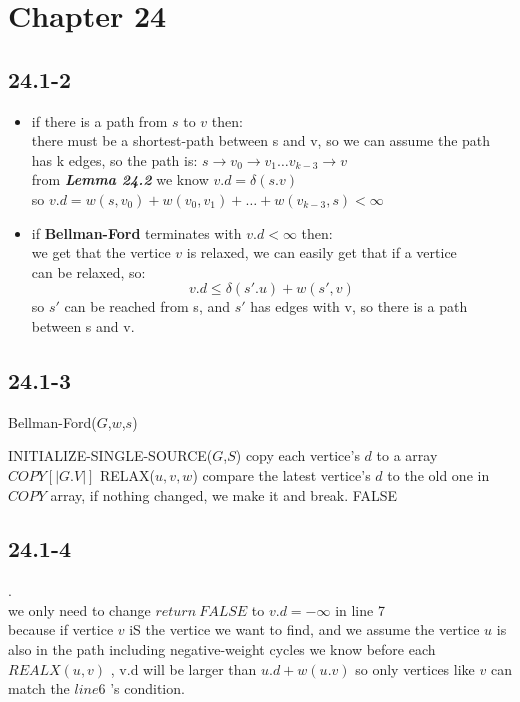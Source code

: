 \documentclass[a4paper,UTF8]{article}
\theoremstyle{definition}
\begin{document}
\section*{Chapter 24 }

\subsection*{24.1-2}
\begin{itemize}

  \item if there is a path from $s$ to $v$ then: \\
  there must be a shortest-path between s and v, so we can assume the path\\
  has k edges, so the path is: $s \to v_0 \to v_1 \ldots v_{k-3} \to v$ \\
  from \textbf{\textit{Lemma 24.2}}  we know $v.d= \delta (s.v)$\\
  so $v.d=w(s,v_0)+w(v_0,v_1)+\ldots+w(v_{k-3},s)<\infty$\\
  \item if \textbf{Bellman-Ford} terminates with $v.d<\infty$ then:\\
  we get that the vertice $v$ is relaxed, we can easily get that if a vertice\\
  can be relaxed, so:
  \[
   v.d\le \delta(s'.u)+w(s',v)
   \]
  so $s'$ can be reached from s, and $s'$ has edges with v, so there is a path between s and v.
\end{itemize}
\subsection*{24.1-3}
\begin{algorithm}[h]
  \caption{Bellman-Ford($G$,$w$,$s$)}
  \begin{algorithmic}[1]
    \State INITIALIZE-SINGLE-SOURCE($G$,$S$)
    \State copy each vertice's $d$ to a array $COPY[|G.V|]$
      \State RELAX($u,v,w$)
      \EndFor
      \State compare the latest vertice's $d$ to the old one in $COPY$ array, if nothing changed, we make it and break.
    \EndFor
    \Return FALSE
    \EndIf
    \EndFor

  \end{algorithmic}
\end{algorithm}

\subsection*{24.1-4}
.\\
we only need to change $return \ FALSE$ to $v.d=-\infty$ in line 7\\
because if vertice $v$ iS the vertice we want to find, and we assume
the vertice $u$ is also in the path including negative-weight cycles
 we know before each $REALX(u,v)$ , v.d will be larger than $u.d+w(u.v)$
 so only vertices like $v$ can match the $line 6$ 's condition.
\end{document}
